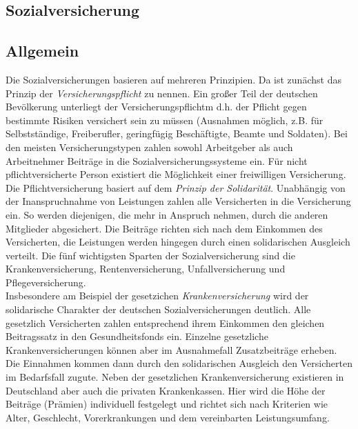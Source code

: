 \documentclass[a4paper, 12pt]{report}
\begin{document}
\begin{multicols}{2}
\section{Sozialversicherung}

\subsection{Allgemein}

Die Sozialversicherungen basieren auf mehreren Prinzipien. Da ist zunächst das
Prinzip der \emph{Versicherungspflicht} zu nennen. Ein großer Teil der deutschen
Bevölkerung unterliegt der Versicherungspflichtm d.h. der Pflicht gegen
bestimmte Risiken versichert sein zu müssen (Ausnahmen möglich, z.B. für
Selbstständige, Freiberufler, geringfügig Beschäftigte, Beamte und Soldaten).
Bei den meisten Versicherungstypen zahlen sowohl Arbeitgeber als auch
Arbeitnehmer Beiträge in die Sozialversicherungssysteme ein. Für nicht
pflichtversicherte Person existiert die Möglichkeit einer freiwilligen
Versicherung. \\

Die Pflichtversicherung basiert auf dem \emph{Prinzip der Solidarität}.
Unabhängig von der Inanspruchnahme von Leistungen zahlen alle Versicherten in
die Versicherung ein. So werden diejenigen, die mehr in Anspruch nehmen, durch
die anderen Mitglieder abgesichert. Die Beiträge richten sich nach dem Einkommen
des Versicherten, die Leistungen werden hingegen durch einen solidarischen
Ausgleich verteilt. Die fünf wichtigsten Sparten der Sozialversicherung sind die
Krankenversicherung, Rentenversicherung, Unfallversicherung und
Pflegeversicherung. \\

Insbesondere am Beispiel der gesetzichen \emph{Krankenversicherung} wird der
solidarische Charakter der deutschen Sozialversicherungen deutlich. Alle
gesetzlich Versicherten zahlen entsprechend ihrem Einkommen den gleichen
Beitragssatz in den Gesundheitsfonds ein. Einzelne gesetzliche
Krankenversicherungen können aber im Ausnahmefall Zusatzbeiträge erheben. Die
Einnahmen kommen dann durch den solidarischen Ausgleich den Versicherten im
Bedarfsfall zugute. Neben der gesetzlichen Krankenversicherung existieren in
Deutschland aber auch die privaten Krankenkassen. Hier wird die Höhe der
Beiträge (Prämien) individuell festgelegt und richtet sich nach Kriterien wie
Alter, Geschlecht, Vorerkrankungen und dem vereinbarten Leistungsumfang. \\


\end{multicols}
\end{document}
